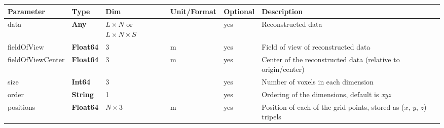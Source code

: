 \documentclass[landscape]{article} %
\newcommand{\inltab}[1]{{\ttfamily\bfseries\color{blue}#1}}
\newcommand{\inlvar}[1]{{\ttfamily#1}}
\begin{document}
\noindent \begin{tabularx}{\columnwidth}{lllllX} 
\textbf{Parameter} & \textbf{Type} & \textbf{Dim} & \textbf{Unit/Format} & \textbf{Optional} & \textbf{Description} \\ \hline 
\inlvar{data} & \inltab{Any} & $L\times N$ or $L\times N \times S$ & & yes & Reconstructed data \\ \hline
\inlvar{fieldOfView} & \inltab{Float64} & $3$ & m & yes & Field of view of reconstructed data \\ \hline
\inlvar{fieldOfViewCenter} & \inltab{Float64} & $3$ & m & yes & Center of the reconstructed data (relative to origin/center) \\ \hline 
\inlvar{size} & \inltab{Int64} & $3$ &  & yes & Number of voxels in each dimension \\ \hline
\inlvar{order} & \inltab{String} & 1 & & yes & Ordering of the dimensions, default is \textit{xyz} \\ \hline
\inlvar{positions} & \inltab{Float64} & $N \times 3$ & m & yes & Position of each of the grid points, stored as ($x$, $y$, $z$) tripels \\ \hline
\end{tabularx}

%

%
\end{document}
